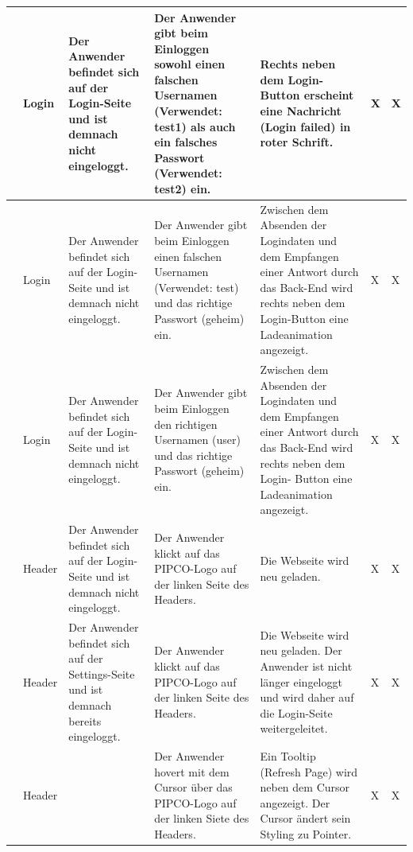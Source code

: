 \begin{longtable}{| p{} | p{} | p{} | p{} | p{} | p{} | p{} |}
	\stepcounter{TestNumber}\arabic{TestNumber} & Login & Der Anwender befindet sich auf der Login-Seite	und ist demnach nicht
	eingeloggt. & Der Anwender gibt beim Einloggen sowohl einen falschen Usernamen (Verwendet: test1) als auch ein falsches Passwort (Verwendet: test2) ein. & Rechts neben dem Login-Button erscheint eine Nachricht (Login failed) in roter Schrift. & X & X \\ \hline
	
	\stepcounter{TestNumber}\arabic{TestNumber} & Login & Der Anwender befindet sich auf der Login-Seite und ist demnach nicht eingeloggt. & Der Anwender gibt beim Einloggen einen falschen Usernamen (Verwendet: test) und das richtige Passwort (geheim) ein. & Zwischen dem Absenden der Logindaten und dem Empfangen einer Antwort durch das Back-End wird rechts neben dem Login-Button eine Ladeanimation angezeigt. & X & X \\ \hline
	
	\stepcounter{TestNumber}\arabic{TestNumber} & Login & Der Anwender befindet sich auf der Login-Seite und ist demnach nicht eingeloggt. & Der Anwender gibt beim Einloggen den richtigen Usernamen (user) und das richtige Passwort (geheim) ein. & Zwischen dem Absenden	der Logindaten und dem Empfangen einer Antwort
	durch das Back-End wird	rechts neben dem Login-
	Button eine Ladeanimation angezeigt.  & X & X \\ \hline
	
	\stepcounter{TestNumber}\arabic{TestNumber} & Header & Der Anwender befindet sich auf der Login-Seite
	und ist demnach nicht eingeloggt. & Der Anwender klickt auf das
	PIPCO-Logo auf der linken Seite des Headers. & Die Webseite wird neu geladen. & X & X \\ \hline
	
	\stepcounter{TestNumber}\arabic{TestNumber} & Header & Der Anwender befindet sich auf der Settings-Seite und ist demnach	bereits eingeloggt. & Der Anwender klickt auf das PIPCO-Logo auf der linken Seite des Headers. & Die Webseite wird neu geladen. Der Anwender ist
	nicht länger eingeloggt und	wird daher auf die Login-Seite weitergeleitet. & X & X \\ \hline
	
	\stepcounter{TestNumber}\arabic{TestNumber} & Header & & Der Anwender hovert mit dem Cursor über das PIPCO-Logo auf der linken Siete des Headers. & Ein Tooltip (Refresh Page) wird neben dem Cursor angezeigt. Der Cursor ändert sein Styling zu Pointer. & X & X \\ \hline
	

\end{longtable}
